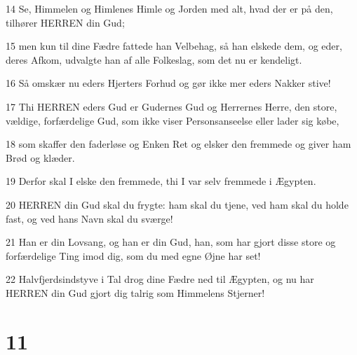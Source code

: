\par 14 Se, Himmelen og Himlenes Himle og Jorden med alt, hvad der er på den, tilhører HERREN din Gud;
\par 15 men kun til dine Fædre fattede han Velbehag, så han elskede dem, og eder, deres Afkom, udvalgte han af alle Folkeslag, som det nu er kendeligt.
\par 16 Så omskær nu eders Hjerters Forhud og gør ikke mer eders Nakker stive!
\par 17 Thi HERREN eders Gud er Gudernes Gud og Herrernes Herre, den store, vældige, forfærdelige Gud, som ikke viser Personsanseelse eller lader sig købe,
\par 18 som skaffer den faderløse og Enken Ret og elsker den fremmede og giver ham Brød og klæder.
\par 19 Derfor skal I elske den fremmede, thi I var selv fremmede i Ægypten.
\par 20 HERREN din Gud skal du frygte: ham skal du tjene, ved ham skal du holde fast, og ved hans Navn skal du sværge!
\par 21 Han er din Lovsang, og han er din Gud, han, som har gjort disse store og forfærdelige Ting imod dig, som du med egne Øjne har set!
\par 22 Halvfjerdsindstyve i Tal drog dine Fædre ned til Ægypten, og nu har HERREN din Gud gjort dig talrig som Himmelens Stjerner!

\chapter{11}

